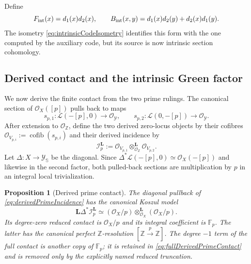 \documentclass[11pt]{amsart}
\newtheorem{proposition}[theorem]{Proposition}
\theoremstyle{definition}
\theoremstyle{remark}
\newcommand{\Z}{\mathbb Z}
\begin{document}
Define
\begin{equation}\label{eq:intrinsicRRform}
 F_{\rm int}(x)=d_1(x)d_2(x),\qquad
 B_{\rm int}(x,y)=d_1(x)d_2(y)+d_2(x)d_1(y).
\end{equation}
The isometry \eqref{eq:intrinsicCodeIsometry} identifies this form with the
one computed by the auxiliary code, but its source is now intrinsic section
cohomology.



\subsection{Derived contact and the intrinsic Green factor}

We now derive the finite contact from the two prime rulings.  The canonical
section of $\mathcal O_X([p])$ pulls back to maps
\begin{equation}\label{eq:primeRulingSections}
 s_{p,1}:\mathcal L(-[p],0)\longrightarrow\mathcal O_{\mathscr Y},
 \qquad
 s_{p,2}:\mathcal L(0,-[p])\longrightarrow\mathcal O_{\mathscr Y}.
\end{equation}
After extension to $\mathcal O_{\Z}$, define the two derived zero-locus
objects by their cofibres
$\mathcal O_{V_{p,i}}:=\operatorname{cofib}(s_{p,i})$ and their derived
incidence by
\begin{equation}\label{eq:derivedPrimeIncidence}
 \mathcal I_p^{\mathbf L}:=
 \mathcal O_{V_{p,1}}\otimes_{\mathcal O_{\Z}}^{\mathbf L}
 \mathcal O_{V_{p,2}}.
\end{equation}
Let $\Delta:X\to\mathscr Y_{\mathbb S}$ be the diagonal.  Since
$\Delta^*\mathcal L(-[p],0)\simeq\mathcal O_X(-[p])$ and likewise in the
second factor, both pulled-back sections are multiplication by $p$ in an
integral local trivialization.

\begin{proposition}[Derived prime contact]
\label{prop:derivedPrimeContact}
The diagonal pullback of \eqref{eq:derivedPrimeIncidence} has the canonical
Koszul model
\begin{equation}\label{eq:fullDerivedPrimeContact}
 \mathbf L\Delta^*\mathcal I_p^{\mathbf L}
 \simeq
 (\mathcal O_X/p)\otimes_{\mathcal O_X}^{\mathbf L}
 (\mathcal O_X/p).
\end{equation}
Its degree-zero reduced contact is $\mathcal O_X/p$ and its integral
coefficient is $\mathbb F_p$.  The latter has the canonical perfect
$\Z$-resolution $[\Z\xrightarrow p\Z]$.  The degree $-1$ term of the full
contact is another copy of $\mathbb F_p$; it is retained in
\eqref{eq:fullDerivedPrimeContact} and is removed only by the explicitly
named reduced truncation.
\end{proposition}
\end{document}
